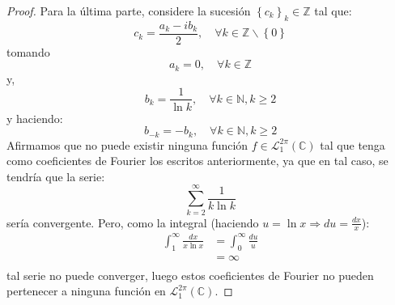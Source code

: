 \documentclass[12pt]{report}
\theoremstyle{largebreak}
\renewcommand{\geq}{\ensuremath{\geqslant}}
\begin{document}
\begin{proof}
        Para la última parte, considere la sucesión $\left\{c_k\right\}_{k}\in\mathbb{Z}$ tal que:
        \begin{equation*}
            c_k=\frac{a_k-ib_k}{2},\quad\forall k\in\mathbb{Z}\backslash\left\{0\right\}
        \end{equation*}
        tomando
        \begin{equation*}
            a_k=0,\quad\forall k\in\mathbb{Z}
        \end{equation*}
        y,
        \begin{equation*}
            b_k=\frac{1}{\ln k},\quad\forall k\in\mathbb{N},k\geq2
        \end{equation*}
        y haciendo:
        \begin{equation*}
            b_{-k}=-b_k,\quad\forall k\in\mathbb{N},k\geq2
        \end{equation*}
        Afirmamos que no puede existir ninguna función $f\in\mathcal{L}_1^{2\pi}(\mathbb{C})$ tal que tenga como coeficientes de Fourier los escritos anteriormente, ya que en tal caso, se tendría que la serie:
        \begin{equation*}
            \sum_{ k=2}^\infty\frac{1}{k\ln k}
        \end{equation*}
        sería convergente. Pero, como la integral (haciendo $u=\ln x\Rightarrow du=\frac{dx}{x}$):
        \begin{equation*}
            \begin{split}
                \int_1^{ \infty}\frac{dx}{x\ln x}&=\int_{0}^{\infty}\frac{du}{u}\\
                &=\infty\\
            \end{split}
        \end{equation*}
        tal serie no puede converger, luego estos coeficientes de Fourier no pueden pertenecer a ninguna función en $\mathcal{L}_1^{2\pi}(\mathbb{C})$.
    \end{proof}
\end{document}
